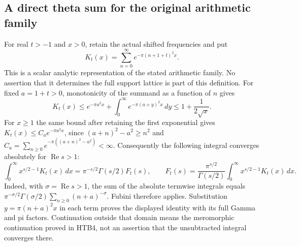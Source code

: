 \documentclass[11pt]{article}
\theoremstyle{definition}
\begin{document}
\subsection{A direct theta sum for the original arithmetic family}

For real $t>-1$ and $x>0$, retain the actual shifted frequencies and put
\begin{equation}\tag{ZTC2}
 K_t(x)=\sum_{n=0}^{\infty}
               e^{-\pi(n+1+t)^2x}.
\end{equation}
This is a scalar analytic representation of the stated arithmetic
family. No assertion that it determines the full support lattice is
part of this definition. For fixed $a=1+t>0$, monotonicity of the
summand as a function of $n$ gives
\begin{equation}\tag{ZTC3}
 K_t(x)\le e^{-\pi a^2x}
              +\int_0^\infty e^{-\pi(a+y)^2x}\,dy
 \le 1+\frac1{2\sqrt x}.
\end{equation}
For $x\ge1$ the same bound after retaining the first exponential
gives $K_t(x)\le C_a e^{-\pi a^2x}$, since
$(a+n)^2-a^2\ge n^2$ and
$C_a=\sum_{n\ge0}e^{-\pi((a+n)^2-a^2)}<\infty$.
Consequently the following integral converges absolutely for
$\operatorname{Re}s>1$:
\begin{equation}\tag{ZTC4}
 \int_0^\infty x^{s/2-1}K_t(x)\,dx
   =\pi^{-s/2}\Gamma(s/2)F_t(s),\qquad
 F_t(s)=\frac{\pi^{s/2}}{\Gamma(s/2)}
                \int_0^\infty x^{s/2-1}K_t(x)\,dx.
\end{equation}
Indeed, with $\sigma=\operatorname{Re}s>1$, the sum of the
absolute termwise integrals equals
$\pi^{-\sigma/2}\Gamma(\sigma/2)\sum_{n\ge0}(n+a)^{-\sigma}$.
Fubini therefore applies. Substitution $y=\pi(n+a)^2x$ in each
term proves the displayed identity with its full Gamma and pi factors.
Continuation outside that domain means the meromorphic continuation
proved in HTB4, not an assertion that the unsubtracted integral converges
there.
\end{document}

